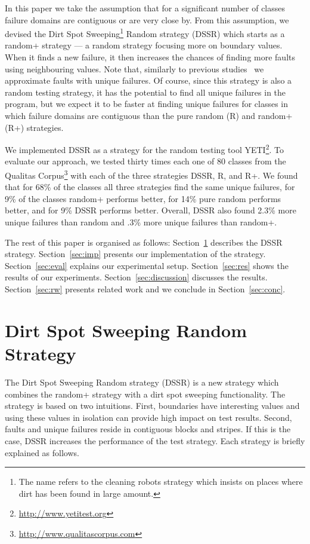\documentclass{acm_proc_article-sp}
\begin{document}
In this paper we take the assumption that for a significant number of classes failure domains are contiguous or are very close by. From this assumption, we devised the Dirt Spot Sweeping\footnote{The name refers to the cleaning robots strategy which insists on places where dirt has been found in large amount.} Random strategy (DSSR) which starts as a random+ strategy --- a random strategy focusing more on boundary values. When it finds a new failure, it then increases the chances of finding more faults using neighbouring values. Note that, similarly to previous studies~\cite{Oriol2012} we approximate faults with unique failures. Of course, since this strategy is also a random testing strategy, it has the potential to find all unique failures in the program, but we expect it to be faster at finding unique failures for classes in which failure domains are contiguous than the pure random (R) and random+ (R+) strategies.

We implemented DSSR as a strategy for the random testing tool YETI\footnote{\url{http://www.yetitest.org}}. To evaluate our approach, we tested thirty times each one of 80 classes from the Qualitas Corpus\footnote{\url{http://www.qualitascorpus.com}} with each of the three strategies DSSR, R, and R+. We found that for 68\% of the classes all three strategies find the same unique failures, for 9\% of the classes random+ performs better, for 14\% pure random performs better, and for 9\% DSSR performs better.
Overall, DSSR also found 2.3\% more unique failures than random and .3\% more unique failures than random+.


The rest of this paper is organised as follows:
Section~\ref{sec:dssr} describes the DSSR strategy. Section~\ref{sec:imp} presents our implementation of the strategy. Section~\ref{sec:eval} explains our experimental setup. Section~\ref{sec:res} shows the results of our experiments. Section~\ref{sec:discussion} discusses the results. Section~\ref{sec:rw} presents related work and we conclude in Section~\ref{sec:conc}.





\section{Dirt Spot Sweeping Random \\ Strategy}\label{sec:dssr}
The Dirt Spot Sweeping Random strategy (DSSR) is a new strategy which combines the random+ strategy with a dirt spot sweeping functionality. The strategy is based on two intuitions. First, boundaries have interesting values and using these values in isolation can provide high impact on test results. Second, faults and unique failures reside in contiguous blocks and stripes. If this is the case, DSSR increases the performance of the test strategy. Each strategy is briefly explained as follows.
\end{document}
